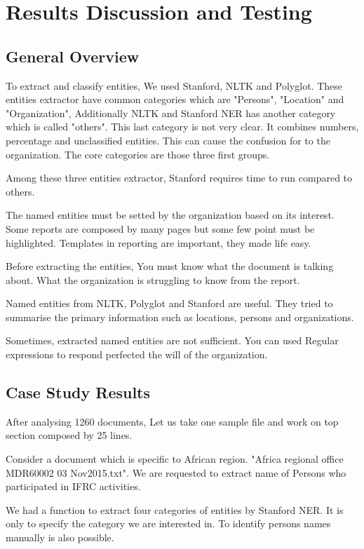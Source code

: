 \chapter{Results Discussion and Testing}
\section{General Overview}
To extract and classify entities, We used Stanford, NLTK and Polyglot. These entities extractor have common categories which are "Persons", "Location" and "Organization", Additionally NLTK and Stanford NER has another category which is called "others". This last category is not very clear. It combines numbers, percentage and unclassified entities. This can cause the confusion for to the organization. The core categories are those three first groups.

Among these three entities extractor, Stanford requires time to run compared to others.

The named entities must be setted by the organization based on its interest.
Some reports are composed by many pages but some few point must be highlighted. Templates in reporting are important, they made life easy.

Before extracting the entities, You must know what the document is  talking about. What the organization is struggling to know from the report.

Named entities from NLTK, Polyglot and Stanford are useful. They tried to summarise the primary information such as locations, persons and organizations. 

Sometimes, extracted named entities are not sufficient. You can  used Regular expressions to respond perfected the will of the organization.

\section{Case Study Results}
After analysing 1260 documents, Let us take one sample file and work on top section composed by 25 lines.

Consider a document which is specific to African region. "Africa regional office MDR60002 03 Nov2015.txt". We are requested to extract name of Persons who participated in IFRC activities.

We had a function to extract four categories of entities by Stanford NER. It is only to specify the category we are interested in. To identify persons names manually is also possible.

